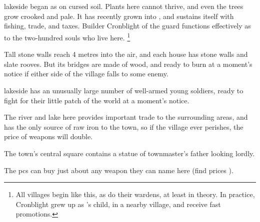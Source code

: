 

\subsection[\Glsfmttext{lakeside}]{~~}
\label{lakeside}

\begin{exampletext}
  \Gls{lakeside} began as  on cursed soil.
  Plants here cannot thrive, and even the trees grow crooked and pale.
  It has recently grown into , and sustains itself with fishing, trade, and taxes.
  Builder Cronblight of the \gls{guard} functions effectively as  to the two-hundred souls who live here.%
  \footnote{All \glspl{village} begin like this, as do their \glspl{warden}, at least in theory.
  In practice, Cronblight grew up as 's child, in a nearby \gls{village}, and receive fast promotions.}
\end{exampletext}

Tall stone walls reach 4 metres into the air, and each house has stone walls and slate rooves.
But its bridges are made of wood, and ready to burn at a moment's notice if either side of the \gls{village} falls to some enemy.

\Gls{lakeside} has an unusually large number of well-armed young soldiers, ready to fight for their little patch of the world at a moment's notice.

The river and lake here provides important trade to the surrounding areas, and has the only source of raw iron to the town, so if the \gls{village} ever perishes, the price of weapons will double.

\label{cronblight}



The town's central square contains a statue of \gls{townmaster}'s father looking lordly.


The \glspl{pc} can buy just about any weapon they can name here (find prices ).

